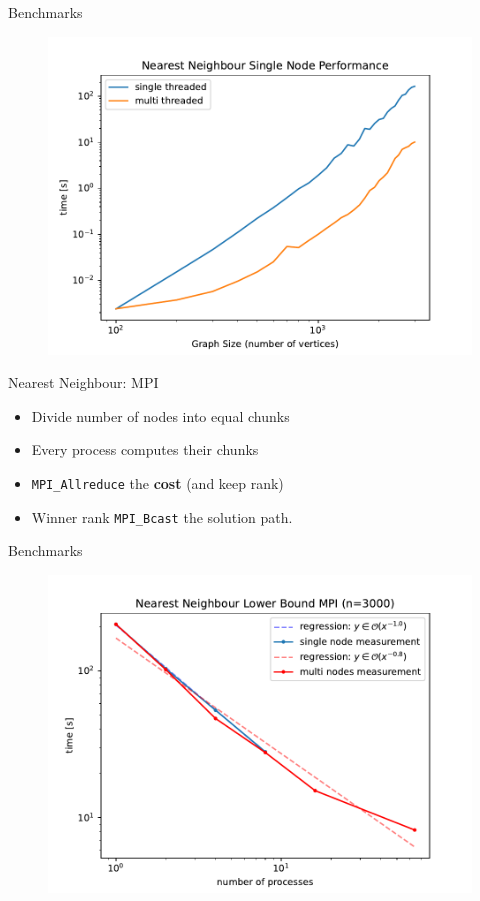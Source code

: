 \begin{frame}{Benchmarks}
  \vspace{-0.25cm}
  \begin{figure}
    \includegraphics[width=\linewidth,height=.9\textheight,keepaspectratio]{../assets/nn-stmt.pdf}
  \end{figure}
\end{frame}

\begin{frame}{Nearest Neighbour: MPI}
  \begin{itemize}
    \item Divide number of nodes into equal chunks
      \pause
    \item Every process computes their chunks
      \pause
    \item \texttt{MPI\_Allreduce} the \textbf{cost} (and keep rank)
      \pause
    \item Winner rank \texttt{MPI\_Bcast} the solution path.
  \end{itemize}
\end{frame}

\begin{frame}{Benchmarks}
  \vspace{-0.25cm}
  \begin{figure}
    \includegraphics[width=\linewidth,height=.9\textheight,keepaspectratio]{../assets/nn-mpi.pdf}
  \end{figure}
\end{frame}
